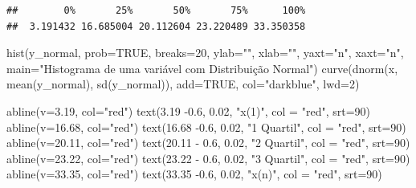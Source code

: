\documentclass[
]{book}
\newenvironment{Shaded}{\begin{snugshade}}{\end{snugshade}}
\newcommand{\AttributeTok}[1]{\textcolor[rgb]{0.77,0.63,0.00}{#1}}
\newcommand{\ConstantTok}[1]{\textcolor[rgb]{0.00,0.00,0.00}{#1}}
\newcommand{\DecValTok}[1]{\textcolor[rgb]{0.00,0.00,0.81}{#1}}
\newcommand{\FloatTok}[1]{\textcolor[rgb]{0.00,0.00,0.81}{#1}}
\newcommand{\FunctionTok}[1]{\textcolor[rgb]{0.00,0.00,0.00}{#1}}
\newcommand{\NormalTok}[1]{#1}
\newcommand{\SpecialCharTok}[1]{\textcolor[rgb]{0.00,0.00,0.00}{#1}}
\newcommand{\StringTok}[1]{\textcolor[rgb]{0.31,0.60,0.02}{#1}}
\begin{document}
\begin{verbatim}
##        0%       25%       50%       75%      100% 
##  3.191432 16.685004 20.112604 23.220489 33.350358
\end{verbatim}

\begin{Shaded}
\begin{Highlighting}[]
\FunctionTok{hist}\NormalTok{(y\_normal, }\AttributeTok{prob=}\ConstantTok{TRUE}\NormalTok{, }\AttributeTok{breaks=}\DecValTok{20}\NormalTok{, }\AttributeTok{ylab=}\StringTok{""}\NormalTok{, }\AttributeTok{xlab=}\StringTok{""}\NormalTok{, }\AttributeTok{yaxt=}\StringTok{"n"}\NormalTok{,  }\AttributeTok{xaxt=}\StringTok{"n"}\NormalTok{, }\AttributeTok{main=}\StringTok{"Histograma de uma variável com Distribuição Normal"}\NormalTok{)}
\FunctionTok{curve}\NormalTok{(}\FunctionTok{dnorm}\NormalTok{(x, }\FunctionTok{mean}\NormalTok{(y\_normal), }\FunctionTok{sd}\NormalTok{(y\_normal)), }\AttributeTok{add=}\ConstantTok{TRUE}\NormalTok{, }\AttributeTok{col=}\StringTok{"darkblue"}\NormalTok{, }\AttributeTok{lwd=}\DecValTok{2}\NormalTok{)}

\FunctionTok{abline}\NormalTok{(}\AttributeTok{v=}\FloatTok{3.19}\NormalTok{, }\AttributeTok{col=}\StringTok{"red"}\NormalTok{) }
\FunctionTok{text}\NormalTok{(}\FloatTok{3.19} \SpecialCharTok{{-}}\FloatTok{0.6}\NormalTok{, }\FloatTok{0.02}\NormalTok{, }\StringTok{"x(1)"}\NormalTok{, }\AttributeTok{col =} \StringTok{"red"}\NormalTok{, }\AttributeTok{srt=}\DecValTok{90}\NormalTok{)}
\FunctionTok{abline}\NormalTok{(}\AttributeTok{v=}\FloatTok{16.68}\NormalTok{, }\AttributeTok{col=}\StringTok{"red"}\NormalTok{) }
\FunctionTok{text}\NormalTok{(}\FloatTok{16.68} \SpecialCharTok{{-}}\FloatTok{0.6}\NormalTok{, }\FloatTok{0.02}\NormalTok{, }\StringTok{"1 Quartil"}\NormalTok{, }\AttributeTok{col =} \StringTok{"red"}\NormalTok{, }\AttributeTok{srt=}\DecValTok{90}\NormalTok{)}
\FunctionTok{abline}\NormalTok{(}\AttributeTok{v=}\FloatTok{20.11}\NormalTok{, }\AttributeTok{col=}\StringTok{"red"}\NormalTok{) }
\FunctionTok{text}\NormalTok{(}\FloatTok{20.11} \SpecialCharTok{{-}} \FloatTok{0.6}\NormalTok{, }\FloatTok{0.02}\NormalTok{, }\StringTok{"2 Quartil"}\NormalTok{, }\AttributeTok{col =} \StringTok{"red"}\NormalTok{, }\AttributeTok{srt=}\DecValTok{90}\NormalTok{)}
\FunctionTok{abline}\NormalTok{(}\AttributeTok{v=}\FloatTok{23.22}\NormalTok{, }\AttributeTok{col=}\StringTok{"red"}\NormalTok{) }
\FunctionTok{text}\NormalTok{(}\FloatTok{23.22} \SpecialCharTok{{-}} \FloatTok{0.6}\NormalTok{, }\FloatTok{0.02}\NormalTok{, }\StringTok{"3 Quartil"}\NormalTok{, }\AttributeTok{col =} \StringTok{"red"}\NormalTok{, }\AttributeTok{srt=}\DecValTok{90}\NormalTok{)}
\FunctionTok{abline}\NormalTok{(}\AttributeTok{v=}\FloatTok{33.35}\NormalTok{, }\AttributeTok{col=}\StringTok{"red"}\NormalTok{) }
\FunctionTok{text}\NormalTok{(}\FloatTok{33.35} \SpecialCharTok{{-}}\FloatTok{0.6}\NormalTok{, }\FloatTok{0.02}\NormalTok{, }\StringTok{"x(n)"}\NormalTok{, }\AttributeTok{col =} \StringTok{"red"}\NormalTok{, }\AttributeTok{srt=}\DecValTok{90}\NormalTok{)}
\end{Highlighting}
\end{Shaded}
\end{document}
